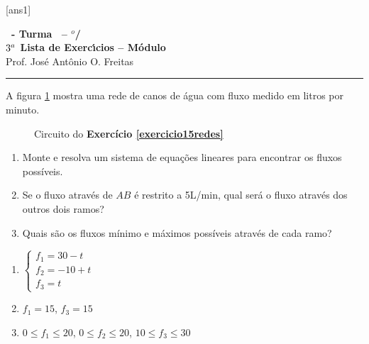 \documentclass[12pt]{exam}
\begin{document}
  [ans1]
  \begin{center}
    {\Large\bf \disciplina\ - Turma \turma\ -- \semestre$^{o}$/\ano} \\ \vspace{9pt} {\large\bf
        $3^a$ Lista de Exerc{\'\i}cios -- Módulo \numeromodulo}\\ \vspace{9pt} Prof. Jos{\'e} Ant{\^o}nio O. Freitas
  \end{center}
  \hrule


\begin{exercicio}\label{exercicio15redes}
  A figura \ref{exercicio15redespoole} mostra uma rede de canos de água com fluxo medido em litros por minuto.
  \begin{figure}[!h]
    \centering
    
    \caption{Circuito do \textbf{Exercício \ref{exercicio15redes}}}
    \label{exercicio15redespoole}
  \end{figure}

  \begin{enumerate}
    \item Monte e resolva um sistema de equações lineares para encontrar os fluxos possíveis.
    \item Se o fluxo através de $AB$ é restrito a 5L/min, qual será o fluxo através dos outros dois ramos?
    \item Quais são os fluxos mínimo e máximos possíveis através de cada ramo?
  \end{enumerate}
  \begin{solucao}
    \begin{enumerate}
      \item $\begin{cases}f_1 = 30 - t\\f_2 = -10 + t\\f_3 = t\end{cases}$
      \item $f_1 = 15$, $f_3 = 15$
      \item $0 \le f_1 \le 20$, $0 \le f_2 \le 20$, $10 \le f_3 \le 30$
    \end{enumerate}
  \end{solucao}
\end{exercicio}
\end{document}

